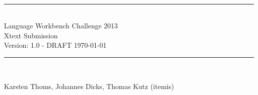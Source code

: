 \begin{titlepage}

\begin{center}

\\[3cm]


\rule{\linewidth}{0.7mm}
\\[0.4cm]


    \selectfont
    \LARGE{\color{darkblue}Language Workbench Challenge 2013 \\
    Xtext Submission} \\[0.5cm]

    \color{black}
    \large{Version: 1.0 - DRAFT \today}
    \\[0.4cm]
\rule{\linewidth}{0.7mm}
\\[1.5cm]
\normalfont

\selectfont
Karsten Thoms, Johannes Dicks, Thomas Kutz (itemis)
\normalfont

\vfill


\end{center}

\end{titlepage}  